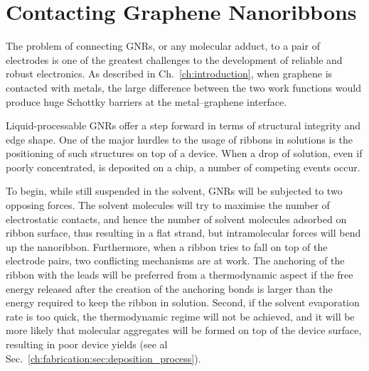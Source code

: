 \section{Contacting Graphene Nanoribbons}\label{ch:fabrciation:sec:contacting_gnrs}

The problem of connecting \glspl{GNR}, or any molecular adduct, to a pair of electrodes is one of the greatest challenges to the development of reliable and robust electronics. As described in Ch.~\ref{ch:introduction}, when graphene is contacted with metals, the large difference between the two work functions would produce huge Schottky barriers at the metal--graphene interface.

Liquid-processable \glspl{GNR} offer a step forward in terms of structural integrity and edge shape. One of the major hurdles to the usage of ribbons in solutions is the positioning of such structures on top of a device. When a drop of solution, even if poorly concentrated, is deposited on a chip, a number of competing events occur.

To begin, while still suspended in the solvent, \glspl{GNR} will be subjected to two opposing forces. The solvent molecules will try to maximise the number of electrostatic contacts, and hence the number of solvent molecules adsorbed on ribbon surface, thus resulting in a flat strand, but intramolecular forces will bend up the nanoribbon. Furthermore, when a ribbon tries to fall on top of the electrode pairs, two conflicting mechanisms are at work. The anchoring of the ribbon with the leads will be preferred from a thermodynamic aspect if the free energy released after the creation of the anchoring bonds is larger than the energy required to keep the ribbon in solution. Second, if the solvent evaporation rate is too quick, the thermodynamic regime will not be achieved, and it will be more likely that molecular aggregates will be formed on top of the device surface, resulting in poor device yields (see al Sec.~\ref{ch:fabrication:sec:deposition_process}).

